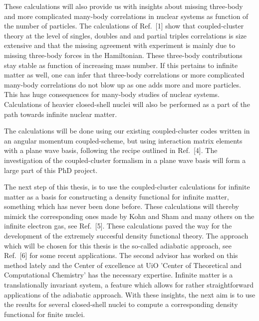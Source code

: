 \documentclass[prl,preprint]{revtex4}
\begin{document}
These calculations will also provide us with insights about missing three-body and more complicated many-body correlations in nuclear systems as function of the number of particles. The calculations
of Ref.~[1] show that coupled-cluster theory at the level of singles, doubles and and partial triples correlations is size extensive and that the missing
agreement with experiment is mainly due to missing three-body forces in the Hamiltonian.  These three-body contributions stay stable as function of increasing
mass number. If this pertains to infinite matter as well, one can infer 
that three-body correlations or more complicated many-body correlations do not
blow up as one adds more and more particles. This has huge consequences for many-body studies of nuclear systems. 
Calculations of heavier closed-shell nuclei will also be performed as a part of the path towards infinite nuclear matter.

The calculations will be done using our existing coupled-cluster codes written in an angular momentum coupled-scheme, but using interaction matrix elements 
with a plane wave basis, following the recipe outlined in Ref.~[4]. The investigation of the coupled-cluster formalism in a plane wave basis will form a large part of this PhD project. 

The next step of this thesis, is to use the coupled-cluster calculations
for infinite matter as a basis for constructing a density functional for 
infinite matter, something which has never been done before. These calculations
will thereby mimick the corresponding ones made by Kohn and Sham and many others 
on the infinite electron gas, see Ref.~[5]. These calculations paved the way for the development of the extremely succesful density functional theory. 
The approach which will be chosen for this thesis is the so-called adiabatic
approach, see Ref.~[6] for some recent applications.  The second advisor has worked on this method lately
and the Center of excellence at UiO 'Center of Theoretical and Computational Chemistry' has the necessary
expertise.  
Infinite matter is a translationally invariant system, a feature which allows for rather straightforward applications of the adiabatic approach. 
With these insights, the next aim is to use the results for several 
closed-shell nuclei to compute a corresponding density functional for 
finite nuclei. 
\end{document}
